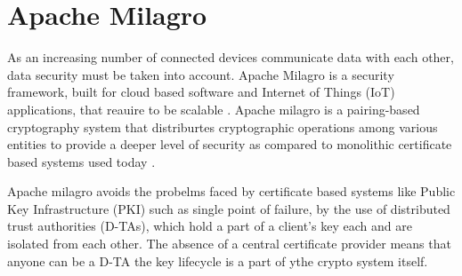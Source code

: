 \section{Apache Milagro}
 

As an increasing number of connected devices communicate data with
each other, data security must be taken into account. Apache Milagro
is a security framework, built for cloud based software and Internet
of Things (IoT) applications, that reauire to be scalable
\cite{hid-sp18-503-www-milagro}. Apache milagro is a pairing-based
cryptography system that distriburtes cryptographic operations among
various entities to provide a deeper level of security as compared to
monolithic certificate based systems used today
\cite{hid-sp18-503-www-milagro-docs}.

Apache milagro avoids the probelms faced by certificate based systems
like Public Key Infrastructure (PKI) such as single point of failure,
by the use of distributed trust authorities (D-TAs), which hold a part
of a client's key each and are isolated from each other. The absence
of a central certificate provider means that anyone can be a D-TA the
key lifecycle is a part of ythe crypto system
itself\cite{hid-sp18-503-www-milagro-docs}.
